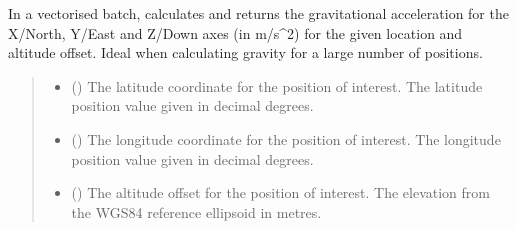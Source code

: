 \documentclass[letterpaper,10pt,english]{sphinxmanual}
\begin{document}
\begin{fulllineitems}
\begin{fulllineitems}
\begin{quote}
\begin{description}
\end{description}\end{quote}

\end{fulllineitems}


\begin{fulllineitems}
\label{\detokenize{modules/gravity/map:qnav.gravity.map.GravityMap.calc_gravity_xyz_vec}}
\pysigstartsignatures
{}
\pysigstopsignatures
\sphinxAtStartPar
In a vectorised batch, calculates and returns the gravitational
acceleration for the X/North, Y/East and Z/Down axes (in m/s\textasciicircum{}2)
for the given location and altitude offset. Ideal when calculating
gravity for a large number of positions.
\begin{quote}\begin{description}
\begin{itemize}
\item {} 
\sphinxAtStartPar
{} () \textendash{} The latitude coordinate for the position of interest.
The latitude position value given in decimal degrees.

\item {} 
\sphinxAtStartPar
{} () \textendash{} The longitude coordinate for the position of interest.
The longitude position value given in decimal degrees.

\item {} 
\sphinxAtStartPar
{} () \textendash{} The altitude offset for the position of interest.
The elevation from the WGS\sphinxhyphen{}84 reference ellipsoid in metres.

\end{itemize}


\end{description}
\end{quote}
\end{fulllineitems}
\end{fulllineitems}
\end{document}
